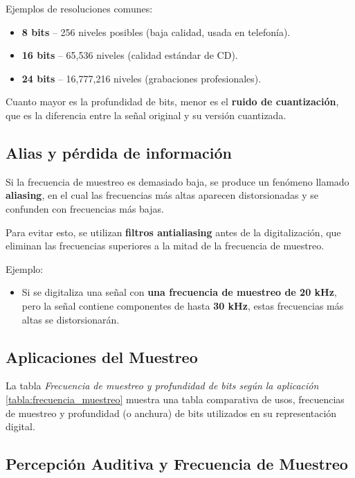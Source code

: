 Ejemplos de resoluciones comunes:
\begin{itemize}
    \item \textbf{8 bits} – 256 niveles posibles (baja calidad, usada en telefonía).
    \item \textbf{16 bits} – 65,536 niveles (calidad estándar de CD).
    \item \textbf{24 bits} – 16,777,216 niveles (grabaciones profesionales).
\end{itemize}

Cuanto mayor es la profundidad de bits, menor es el \textbf{ruido de cuantización}, que es la diferencia entre la señal original y su versión cuantizada.

\subsection{Alias y pérdida de información}

Si la frecuencia de muestreo es demasiado baja, se produce un fenómeno llamado \textbf{aliasing}, en el cual las frecuencias más altas aparecen distorsionadas y se confunden con frecuencias más bajas.

Para evitar esto, se utilizan \textbf{filtros antialiasing} antes de la digitalización, que eliminan las frecuencias superiores a la mitad de la frecuencia de muestreo.

Ejemplo:
\begin{itemize}
    \item Si se digitaliza una señal con \textbf{una frecuencia de muestreo de 20 kHz}, pero la señal contiene componentes de hasta \textbf{30 kHz}, estas frecuencias más altas se distorsionarán.
\end{itemize}

\subsection{Aplicaciones del Muestreo}



La tabla \emph{Frecuencia de muestreo y profundidad de bits según la aplicación} \ref{tabla:frecuencia_muestreo} muestra una tabla comparativa de usos, frecuencias de muestreo y profundidad (o anchura) de bits utilizados en su representación digital.

\subsection{Percepción Auditiva y Frecuencia de Muestreo}

